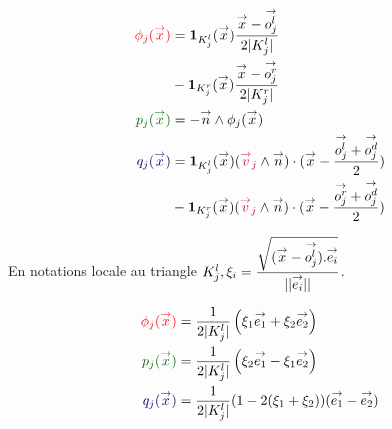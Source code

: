     \begin{minipage}{0.58\textwidth}
      \centering
      \begin{tikzpicture}[scale=2.5]
        
      \end{tikzpicture}
    \end{minipage} 
    \begin{minipage}{0.4\textwidth}
      \begin{align*}
        \color{red}{\phi_j(\vx)} &= \mathbf{1}_{K_j^l}(\vx)\frac{\vx-\vect{o_j^l}}{2|K_j^l|} \\&- \mathbf{1}_{K_j^r}(\vx)\frac{\vx-\vect{o_j^r}}{2|K_j^r|}\\
        \color{black!60!green}{p_j(\vx)} &= -\vn \pvect \phi_j(\vx)\\
        \color{black!60!blue}{q_j(\vx)} &= \mathbf{1}_{K_j^l}(\vx) ( { \color{purple}{\vect{v}_j } } \pvect \vn ) \cdot ( \vx - \frac{\vect{o^l_j} + \vect{o^d_j}}{2} ) \\
        &- \mathbf{1}_{K_j^r}(\vx) ( { \color{purple}{\vect{v}_j } } \pvect \vn ) \cdot ( \vx - \frac{\vect{o^r_j} + \vect{o^d_j}}{2} )
      \end{align*}
    \end{minipage}

    En notations locale au triangle \(K_j^l, \xi_i = \frac{\sqrt{(\vx-\vect{o^l_j}).\vect{e_i}}}{||\vect{e_i}||}\).

    \begin{minipage}{0.53\textwidth}
      \centering
      \begin{tikzpicture}[scale=2.5]
        
      \end{tikzpicture}
    \end{minipage}
    \begin{minipage}{0.45\textwidth}
      \begin{align*}
        \color{red}{\phi_j(\vx)} &= \frac{1}{2|K_j^l|}\left(\xi_1 \vect{e_1} + \xi_2 \vect{e_2}\right)\\
        \color{black!60!green}{p_j(\vx)} &= \frac{1}{2|K_j^l|}\left(\xi_2 \vect{e_1} -\xi_1 \vect{e_2}\right)\\
        \color{black!60!blue}{q_j(\vx)} &= \frac{1}{2|K_j^l|}(1-2(\xi_1+\xi_2))(\vect{e_1} -\vect{e_2})
      \end{align*}
    \end{minipage}

